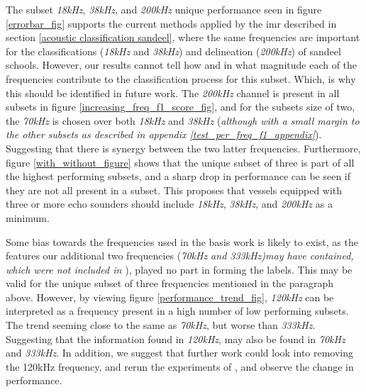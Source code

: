     The subset \textit{18kHz}, \textit{38kHz}, and \textit{200kHz} unique performance seen in figure \ref{errorbar_fig} supports the current methods applied by the \gls{imr} described in section \ref{acoustic classification sandeel}, where the same frequencies are important for the classifications (\textit{18kHz} and \textit{38kHz}) and delineation (\textit{200kHz}) of sandeel schools. However, our results cannot tell how and in what magnitude each of the frequencies contribute to the classification process for this subset. Which, is why this should be identified in future work. The \textit{200kHz} channel is present in all subsets in figure \ref{increasing_freq_f1_score_fig}, and for the subsets size of two, the \textit{70kHz}  is chosen over both \textit{18kHz} and \textit{38kHz} (\textit{although with a small margin to the other subsets as described in appendix \ref{test_per_freq_f1_appendix}}). Suggesting that there is synergy between the two latter frequencies. Furthermore, figure \ref{with_without_figure} shows that the unique subset of three is part of all the highest performing subsets, and a sharp drop in performance can be seen if they are not all present in a subset. This proposes that vessels equipped with three or more echo sounders should include \textit{18kHz}, \textit{38kHz}, and \textit{200kHz} as a minimum. 

    Some bias towards the frequencies used in the basis work is likely to exist, as the features our additional two frequencies (\textit{70kHz and 333kHz)may have contained, which were not included in \citet{brautaset2020acoustic}}), played no part in forming the labels. This may be valid for the unique subset of three frequencies mentioned in the paragraph above. However, by viewing figure \ref{performance_trend_fig}, \textit{120kHz} can be interpreted as a frequency present in a high number of low performing subsets. The trend seeming close to the same as \textit{70kHz}, but worse than \textit{333kHz}. Suggesting that the information found in \textit{120kHz}, may also be found in \textit{70kHz} and \textit{333kHz}. In addition, we suggest that further work could look into removing the 120kHz frequency, and rerun the experiments of \citet{brautaset2020acoustic}, and observe the change in performance. 
    
